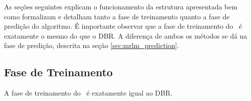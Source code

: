 \begin{itemize}
  
%   
  
\end{itemize}
  As seções seguintes explicam o funcionamento da estrutura apresentada 
  bem como formalizam e detalham tanto a fase de treinamento quanto a fase de predição do algoritmo.
  É importante observar que a fase de treinamento do \MRLMa~é exatamente o mesmo do que o DBR.
  A diferença de ambos os métodos se dá na fase de predição, descrita na seção \ref{sec:mrlm_prediction}.
 
 
 \subsection{Fase de Treinamento}
 \label{sec:mrlm_train}
  A fase de treinamento do \MRLMa~é exatamente igual ao DBR.
  
